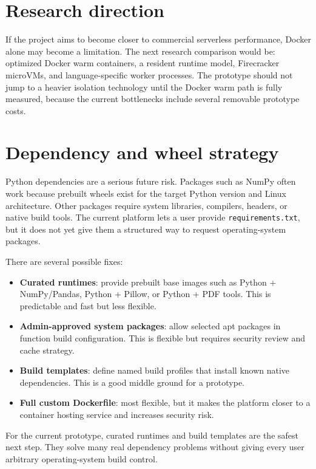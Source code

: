 \documentclass[12pt,a4paper]{report}
\newcommand{\file}[1]{\texttt{#1}}
\begin{document}
\section{Research direction}

If the project aims to become closer to commercial serverless performance,
Docker alone may become a limitation. The next research comparison would be:
optimized Docker warm containers, a resident runtime model, Firecracker
microVMs, and language-specific worker processes. The prototype should not
jump to a heavier isolation technology until the Docker warm path is fully
measured, because the current bottlenecks include several removable prototype
costs.

\section{Dependency and wheel strategy}

Python dependencies are a serious future risk. Packages such as NumPy often
work because prebuilt wheels exist for the target Python version and Linux
architecture. Other packages require system libraries, compilers, headers, or
native build tools. The current platform lets a user provide
\file{requirements.txt}, but it does not yet give them a structured way to
request operating-system packages.

There are several possible fixes:

\begin{itemize}[leftmargin=1.2cm]
  \item \textbf{Curated runtimes}: provide prebuilt base images such as Python + NumPy/Pandas, Python + Pillow, or Python + PDF tools. This is predictable and fast but less flexible.
  \item \textbf{Admin-approved system packages}: allow selected apt packages in function build configuration. This is flexible but requires security review and cache strategy.
  \item \textbf{Build templates}: define named build profiles that install known native dependencies. This is a good middle ground for a prototype.
  \item \textbf{Full custom Dockerfile}: most flexible, but it makes the platform closer to a container hosting service and increases security risk.
\end{itemize}

For the current prototype, curated runtimes and build templates are the safest
next step. They solve many real dependency problems without giving every user
arbitrary operating-system build control.
\end{document}

